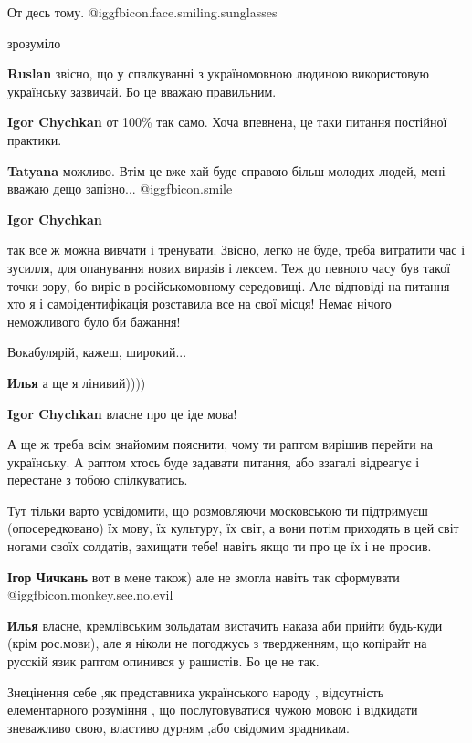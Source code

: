 \begin{itemize}
От десь тому.  @igg{fbicon.face.smiling.sunglasses} 

\begin{itemize} %
зрозуміло

\textbf{Ruslan} звісно, що у спвлкуванні з україномовною людиною використовую українську зазвичай. Бо це вважаю правильним.

\textbf{Igor Chychkan} от 100\% так само. Хоча впевнена, це таки питання постійної практики.

\textbf{Tatyana} можливо. Втім це вже хай буде справою більш молодих людей, мені вважаю дещо запізно...  @igg{fbicon.smile} 
\end{itemize} %

\textbf{Igor Chychkan} 

так все ж можна вивчати і тренувати. Звісно, легко не буде, треба витратити час і зусилля, для опанування нових виразів і лексем.
Теж до певного часу був такої точки зору, бо виріс в російськомовному середовищі. Але відповіді на питання хто я і самоідентифікація розставила все на свої місця!
Немає нічого неможливого було би бажання!

Вокабулярій, кажеш, широкий...

\textbf{Илья} а ще я лінивий))))

\textbf{Igor Chychkan} власне про це іде мова!

А ще ж треба всім знайомим пояснити, чому ти раптом вирішив перейти на
українську. А раптом хтось буде задавати питання, або взагалі відреагує і
перестане з тобою спілкуватись.

Тут тільки варто усвідомити, що розмовляючи московською ти підтримуєш
(опосередковано) їх мову, їх культуру, їх світ, а вони потім приходять в цей
світ ногами своїх солдатів, захищати тебе! навіть якщо ти про це їх і не
просив.

\textbf{Ігор Чичкань} вот в мене також) але не змогла навіть так сформувати @igg{fbicon.monkey.see.no.evil} 

\textbf{Илья} власне, кремлівським зольдатам вистачить наказа аби прийти будь-куди (крім рос.мови), але я ніколи не погоджусь з твердженням, що копірайт на русскій язик раптом опинився у рашистів. Бо це не так.


Знецінення себе ,як представника українського народу , відсутність
елементарного розуміння , що послуговуватися чужою мовою і відкидати зневажливо
свою, властиво дурням ,або свідомим зрадникам.


\end{itemize}

